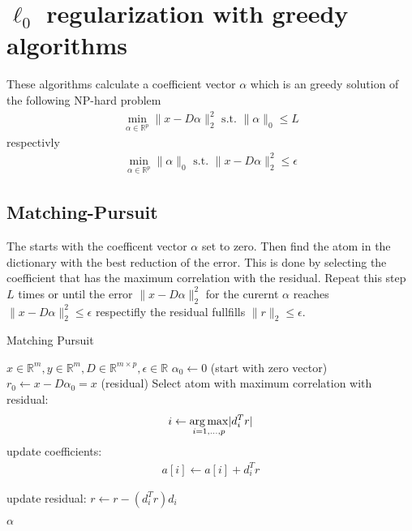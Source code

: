 \section{$\ell_0$ regularization with greedy algorithms}

These algorithms calculate a coefficient vector $\alpha$ which is an greedy solution of the following NP-hard problem
\begin{align}
\min_{\alpha\in\mathbb{R}^{p}}  \lVert x - D\alpha \rVert^{2}_{2} \textrm{ s.t. } \lVert \alpha \rVert_{0} \leq L
\end{align}
respectivly
\begin{align}
\min_{\alpha\in\mathbb{R}^{p}}   \lVert \alpha \rVert_{0}   \textrm{ s.t. } \lVert x - D\alpha \rVert^{2}_{2} \leq \epsilon
\end{align}
\cite{Mallat1993}

\subsection{Matching-Pursuit}
\label{sec:mp}

The  starts with the coefficent vector $\alpha$ set to zero. Then find the atom in the dictionary with the best reduction of the error.
This is done by selecting the coefficient that has the maximum correlation with the residual. 
Repeat this step $L$ times or until the error $\lVert x - D\alpha \rVert^{2}_{2}$ for the curernt $\alpha$ reaches $\lVert x - D\alpha \rVert^{2}_{2} \leq \epsilon$ respectifly the residual fullfills $\lVert r \rVert_2 \leq \epsilon$.


\begin{algorithm}
\caption{Matching Pursuit}
\label{alg:mp}
\begin{algorithmic}[1]
\REQUIRE $x \in \mathbb{R}^m, y \in \mathbb{R}^m, D \in \mathbb{R}^{m\times p}, \epsilon \in \mathbb{R}$
\STATE $\alpha_0 \gets 0$ (start with zero vector)
\STATE $r_0 \gets x-D\alpha_0 = x$ (residual) 
\STATE Select atom with maximum correlation with residual: 
\begin{equation*}
i \gets \operatorname*{arg\,max}_{i=1,...,p} \lvert d_i^Tr \rvert
\end{equation*}
\STATE update coefficients: 
\begin{align}
a[i]  \gets a[i] + d_i^Tr \label{eq:mp_update}
\end{align}

\STATE update residual: $r \gets r - \left(d_i^Tr\right)d_i$

\ENDWHILE
\RETURN $\alpha$
\end{algorithmic}
\end{algorithm}
